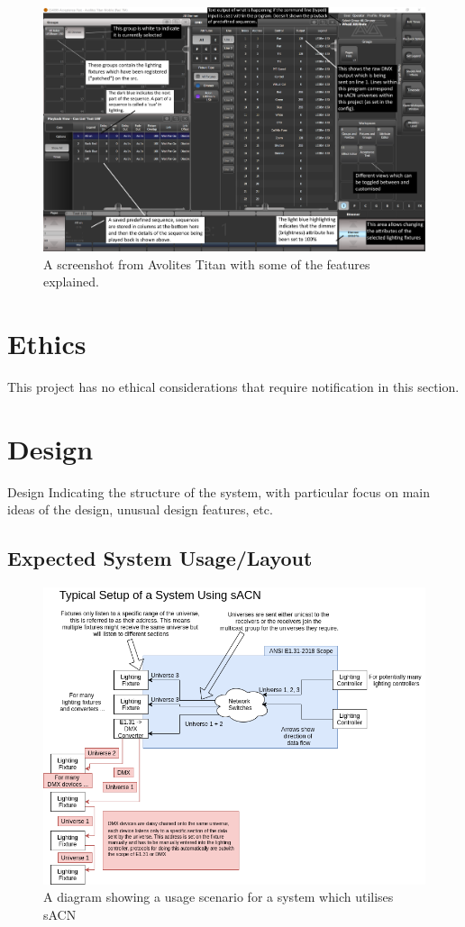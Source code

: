 \documentclass[11pt,a4paper]{article}
\begin{document}
\begin{figure}[H]
	\label{AVO_EXPLAINED}
	\includegraphics[width=\textwidth]{avo_titan_explained}
	\caption{A screenshot from Avolites Titan with some of the features explained.}
\end{figure}

\section{Ethics}
This project has no ethical considerations that require notification in this section.

\section{Design}
Design
Indicating the structure of the system, with particular
focus on main ideas of the design, unusual design
features, etc.

\subsection{Expected System Usage/Layout}
\begin{figure}
\label{Expected_usage}
\includegraphics[width=\textwidth]{CS4099-Expected-Usage.png}
\caption{A diagram showing a usage scenario for a system which utilises sACN}
\end{figure}
\end{document}
